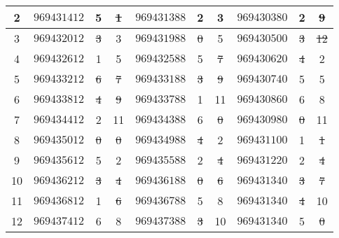 \documentclass{article}
\begin{document}
{\begin{table}[H]
\begin{tabular}{|c|c|@{}c@{}|@{}c@{}|c|@{}c@{}|@{}c@{}|c|@{}c@{}|@{}c@{}|}
2	& \sout{$969431412$} & 5 & \sout{1}	& $969431388$	& 2	& 3	& $969430380$	& 2	& \sout{9}	\\ \hline
3	& \sout{$969432012$} & \sout{3} & 3	& \sout{$969431988$}	& \sout{0}	& 5	& \sout{$969430500$} & \sout{3} & \sout{12}	\\ \hline
4	& $969432612$ & 1 & 5	& \sout{$969432588$}	& 5	& \sout{7}	& \sout{$969430620$}	& \sout{4}	& 2	\\ \hline
5	& \sout{$969433212$} & \sout{6}	& \sout{7}	& \sout{$969433188$}	& \sout{3}	& \sout{9}	& $969430740$	& 5	& 5	\\ \hline
6	& \sout{$969433812$} & \sout{4}	& \sout{9}	& $969433788$	& 1	& 11	& $969430860$	& 6	& 8	\\ \hline
7	& $969434412$ & 2 & 11	& \sout{$969434388$}	& 6	& \sout{0}	& \sout{$969430980$} & \sout{0} & 11	\\ \hline
8	& \sout{$969435012$} & \sout{0} & \sout{0}	& \sout{$969434988$}	& \sout{4}	& 2	& \sout{$969431100$}	& 1	& \sout{1}	\\ \hline
9	& $969435612$ & 5 & 2	& \sout{$969435588$}	& 2	& \sout{4}	& \sout{$969431220$}	& 2	& \sout{4}	\\ \hline
10	& \sout{$969436212$} & \sout{3} & \sout{4}	& \sout{$969436188$}	& \sout{0}	& \sout{6}	& \sout{$969431340$}	& \sout{3}	& \sout{7}	\\ \hline
11	& \sout{$969436812$} & 1 & \sout{6}	& $969436788$	& 5	& 8	& \sout{$969431340$}	& \sout{4}	& 10	\\ \hline
12	& $969437412$ & 6 & 8	& \sout{$969437388$}	& \sout{3}	& 10	& \sout{$969431340$}	& 5	& \sout{0}	\\ \hline
\end{tabular}
\end{table}
}
\end{document}
